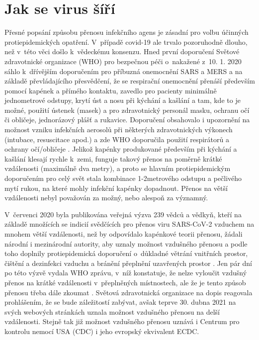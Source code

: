 \section*{Jak se virus šíří}
Přesné popsání způsobu přenosu infekčního agens je zásadní pro volbu účinných protiepidemických opatření. V~případě covid-19 ale trvalo pozoruhodně dlouho, než v~této věci došlo k~vědeckému konsenzu. Hned první doporučení Světové zdravotnické organizace (WHO) pro bezpečnou péči o~nakažené z~10. 1. 2020 sáhlo k~dřívějším doporučením pro příbuzná onemocnění SARS a MERS \cite{WHO:2014} a na základě převládajícího přesvědčení, že se respirační onemocnění přenáší především pomocí kapének a přímého kontaktu, zavedlo pro pacienty minimálně jednometrové odstupy, krytí úst a nosu při kýchání a kašlání a tam, kde to je možné, použití ústenek (masek) a pro zdravotnický personál masku, ochranu očí či obličeje, jednorázový plášť a rukavice. Doporučení obsahovalo i upozornění na možnost vzniku infekčních aerosolů při některých zdravotnických výkonech (intubace, resuscitace apod.) a zde WHO doporučila použití respirátorů a ochrany očí/obličeje \cite{WHO:2020b}. Jelikož kapénky produkované především při kýchání a kašlání klesají rychle k~zemi, funguje takový přenos na poměrně krátké vzdálenosti (maximálně dva metry), a proto se hlavním protiepidemickým doporučením pro celý svět stala kombinace 1-2metrového odstupu a pečlivého mytí rukou, na které mohly infekční kapénky dopadnout. Přenos na větší vzdálenosti nebyl považován za možný, nebo alespoň za významný.

V~červenci 2020 byla publikována veřejná výzva 239 vědců a vědkyň, kteří na základě množících se indicií svědčících pro přenos viru SARS-CoV-2 vzduchem na mnohem větší vzdálenosti, než by odpovídalo kapénkové teorii přenosu, žádali národní i mezinárodní autority, aby uznaly možnost vzdušného přenosu a podle toho doplnily protiepidemická doporučení o~důkladné větrání vnitřních prostor, čištění a dezinfekci vzduchu a bránění přeplnění uzavřených prostor \cite{Morawska:2020}. Jen pár dní po této výzvě vydala WHO zprávu, v~níž konstatuje, že nelze vyloučit vzdušný přenos na krátké vzdálenosti v~přeplněných místnostech, ale že je tento způsob přenosu třeba dále zkoumat \cite{WHO:2020c}. Světová zdravotnická organizace na dopis reagovala prohlášením, že se bude záležitostí zabývat, avšak teprve 30. dubna 2021 na svých webových stránkách uznala možnost vzdušného přenosu na delší vzdálenosti. Stejně tak již možnost vzdušného přenosu uznává i Centrum pro kontrolu nemocí USA (CDC) i jeho evropský ekvivalent ECDC.

